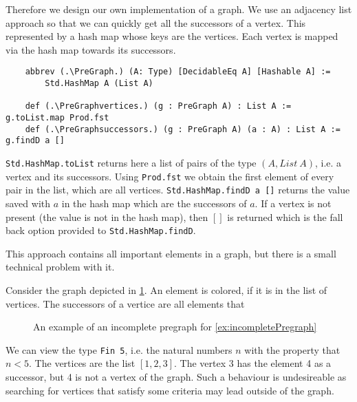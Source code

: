 Therefore we design our own implementation of a graph. We use an adjacency list approach so that we can quickly get all the successors of a vertex. This represented by a hash map whose keys are the vertices. Each vertex is mapped via the hash map towards its successors.

\begin{lstlisting}
    abbrev (.\PreGraph.) (A: Type) [DecidableEq A] [Hashable A] := 
        Std.HashMap A (List A)

    def (.\PreGraphvertices.) (g : PreGraph A) : List A := g.toList.map Prod.fst
    def (.\PreGraphsuccessors.) (g : PreGraph A) (a : A) : List A := g.findD a []
\end{lstlisting}

\lstinline|Std.HashMap.toList| returns here a list of pairs of the type $(A, List\ A)$, i.e. a vertex and its successors. Using \lstinline|Prod.fst| we obtain the first element of every pair in the list, which are all vertices. \lstinline|Std.HashMap.findD a []| returns the value saved with $a$ in the hash map which are the successors of $a$. If a vertex is not present (the value is not in the hash map), then $[]$ is returned which is the fall back option provided to  \lstinline|Std.HashMap.findD|.

This approach contains all important elements in a graph, but there is a small technical problem with it. 

\begin{example}\label{ex:incompletePregraph}
    
    Consider the graph depicted in \cref{ex:counterexampleGraph}. An element is colored, if it is in the list of vertices. The successors of a vertice are all elements that 

\begin{figure}
    \centering
    \caption{An example of an incomplete pregraph for \cref{ex:incompletePregraph}}      
    \label{ex:counterexampleGraph}

\end{figure}
    We can view the type \lstinline|Fin 5|, i.e. the natural numbers $n$ with the property that $n<5$. The vertices are the list $[1,2,3]$. The vertex 3 has the element 4 as a successor, but 4 is not a vertex of the graph. Such a behaviour is undesireable as searching for vertices that satisfy some criteria may lead outside of the graph.
\end{example}

